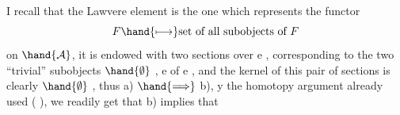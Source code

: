 I recall that the Lawvere element is the one which represents the
functor
\[ F \hand{\longmapsto} \text{set of all subobjects of } F \]
on $\hand{\mathcal{A}}$, it is endowed with two sections over e , corresponding to the
two ``trivial'' subobjects $\hand{\emptyset}$ , e of e , and the kernel of this pair of
sections is clearly $\hand{\emptyset}$ , thus a) $\hand{\Longrightarrow}$ b),  
 y the homotopy argument
already used ( ), we readily get that b) implies that 
